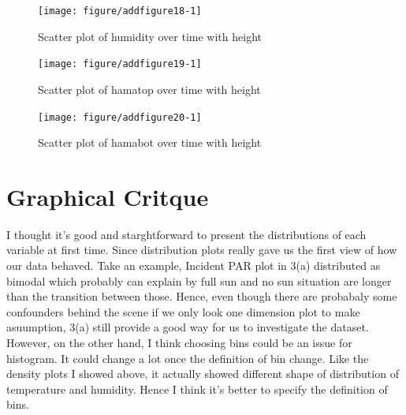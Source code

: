 \documentclass{article}\usepackage[]{graphicx}\usepackage[]{color}
\newenvironment{knitrout}{}{} %
\begin{document}
\begin{knitrout}
\color{fgcolor}\begin{figure}[h!]

{\centering \texttt{[image: figure/addfigure18-1]} 

}

\caption[Scatter plot of humidity over time with height]{Scatter plot of humidity over time with height}\label{fig:addfigure18}
\end{figure}


\end{knitrout}

\begin{knitrout}
\color{fgcolor}\begin{figure}[h!]

{\centering \texttt{[image: figure/addfigure19-1]} 

}

\caption[Scatter plot of hamatop over time with height]{Scatter plot of hamatop over time with height}\label{fig:addfigure19}
\end{figure}


\end{knitrout}

\begin{knitrout}
\color{fgcolor}\begin{figure}[h!]

{\centering \texttt{[image: figure/addfigure20-1]} 

}

\caption[Scatter plot of hamabot over time with height]{Scatter plot of hamabot over time with height}\label{fig:addfigure20}
\end{figure}


\end{knitrout}
\section{Graphical Critque}
I thought it's good and starghtforward to present the distributions of each variable at first time. Since distribution plots really gave us the first view of how our data behaved. Take an example, Incident PAR plot in 3(a) distributed as bimodal which probably can explain by full sun and no sun situation are longer than the transition between those. Hence, even though there are probabaly some confounders behind the scene if we only look one dimension plot to make asuumption, 3(a) still provide a good way for us to investigate the dataset. However, on the other hand, I think choosing bins could be an issue for histogram. It could change a lot once the definition of bin change. Like the density plots I showed above, it actually showed different shape of distribution of temperature and humidity. Hence I think it's better to specify the definition of bins.\\
\end{document}
